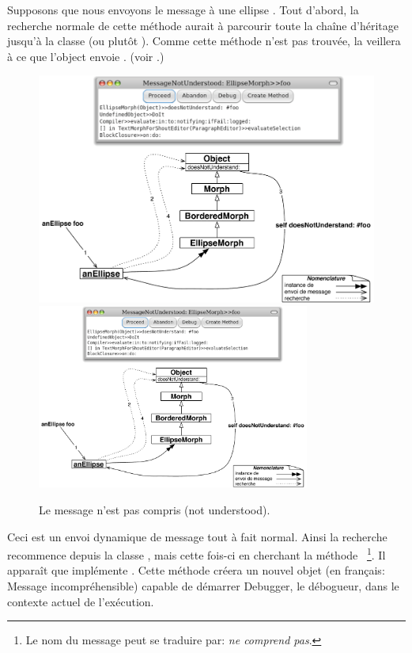 \documentclass[a4paper,10pt,twoside]{book}
\begin{document}
Supposons que nous envoyons le message  à une ellipse .
Tout d'abord, la recherche normale de cette méthode aurait à parcourir
toute la chaîne d'héritage jusqu'à la classe  (ou
plutôt ).
Comme cette méthode n'est pas trouvée, la  veillera
à ce que l'object envoie .
(voir .)

\begin{figure}[htb]
\begin{center}
\ifluluelse
	{\includegraphics[width=\textwidth]{fooNotFound}}
	{\includegraphics[width=0.8\textwidth]{fooNotFound}}
\caption{Le message  n'est pas compris (not understood).}
\end{center}
\end{figure}

Ceci est un envoi dynamique de message tout à fait normal. Ainsi
la recherche recommence depuis la classe , mais
cette fois-ci en cherchant la méthode ~\footnote{Le nom du message peut se traduire par: \emph{ne comprend pas}.}.
Il apparaît que  implémente .
Cette méthode créera un nouvel objet  (en français: Message incompréhensible) capable de démarrer Debugger, le débogueur, dans le contexte actuel de l'exécution.
\end{document}
